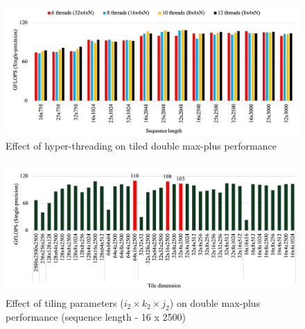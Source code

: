\begin{figure}[htbp]
\centerline{\includegraphics[scale=0.40, trim=4 4 4 4,clip]{double_max_plus_hyperthreading_new.png}}
\caption{Effect of hyper-threading on tiled double max-plus performance}
\label{fig:hyperthreading_effect}
\end{figure}

\begin{figure}[htbp]
\centerline{\includegraphics[scale=0.40, trim=4 4 4 4,clip]{double_max_plus_tile_exploration.png}}
\caption{Effect of tiling parameters ($i_{2} \times k_{2} \times j_{2}$) on double max-plus performance (sequence length - 16 x 2500)}
\label{fig:tiling_parameter}
\end{figure}


